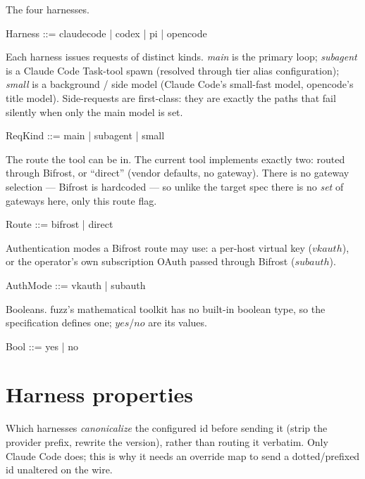 \documentclass{article}
\begin{document}
\begin{zed}
\end{zed}

The four harnesses.

\begin{zed}
  Harness ::= claudecode | codex | pi | opencode
\end{zed}

Each harness issues requests of distinct kinds. \emph{main} is the primary
loop; \emph{subagent} is a Claude Code Task-tool spawn (resolved through tier
alias configuration); \emph{small} is a background / side model (Claude Code's
small-fast model, opencode's title model). Side-requests are first-class: they
are exactly the paths that fail silently when only the main model is set.

\begin{zed}
  ReqKind ::= main | subagent | small
\end{zed}

The route the tool can be in. The current tool implements exactly two: routed
through Bifrost, or ``direct'' (vendor defaults, no gateway). There is no
gateway selection --- Bifrost is hardcoded --- so unlike the target spec there
is no \emph{set} of gateways here, only this route flag.

\begin{zed}
  Route ::= bifrost | direct
\end{zed}

Authentication modes a Bifrost route may use: a per-host virtual key
($vkauth$), or the operator's own subscription OAuth passed through Bifrost
($subauth$).

\begin{zed}
  AuthMode ::= vkauth | subauth
\end{zed}

Booleans. fuzz's mathematical toolkit has no built-in boolean type, so the
specification defines one; $yes$/$no$ are its values.

\begin{zed}
  Bool ::= yes | no
\end{zed}

\section{Harness properties}

Which harnesses \emph{canonicalize} the configured id before sending it (strip
the provider prefix, rewrite the version), rather than routing it verbatim.
Only Claude Code does; this is why it needs an override map to send a
dotted/prefixed id unaltered on the wire.
\end{document}
